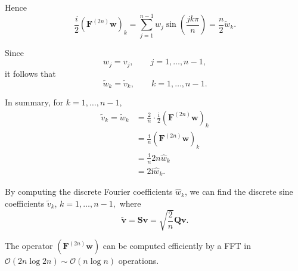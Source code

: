 Hence
\begin{equation*}
  \frac{i}{2} ( \bm F^{(2n)} \bm w)_k =
  \sum_{j=1}^{n-1} w_j \sin \left( \frac{j k \pi}{n} \right) = \frac{n}{2} \tilde{w}_k.
\end{equation*}

Since
\begin{equation*}
  w_j=v_j, \qquad j=1,\ldots,n-1,
\end{equation*}
it follows that
\begin{equation*}
  \widetilde{w}_k = \widetilde{v}_k, \qquad k=1,\ldots,n-1.
\end{equation*}

In summary, for $k=1,\ldots,n-1$,
\begin{align*}
  \tilde{v}_k = \tilde{w}_k
  &= \frac{2}{n} \cdot \frac{\text{i}}{2} (\bm F^{(2n)} \bm w)_k \\
  &= \frac{\text{i}}{n} (\bm F^{(2n)} \bm w)_k \\
  &= \frac{\text{i}}{n} 2n \hat{w}_k \\
  &= 2\text{i} \hat{w}_k.
\end{align*}

By computing the discrete Fourier coefficients $\hat{w}_k$, we can find the
discrete sine coefficients $\widetilde{v}_k$, $k=1,\ldots,n-1,$ where
\begin{equation*}
  \bm \widetilde{v} = \bm S \bm v = \sqrt{\frac{2}{n}} \bm Q \bm v.
\end{equation*}

The operator $(\bm F^{(2n)} \bm w)$ can be computed efficiently by a FFT in
$\mathcal{O}(2n \log 2n) \sim \mathcal{O} (n \log n)$ operations.

